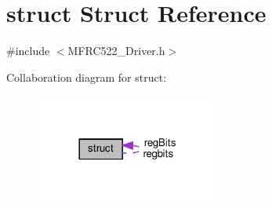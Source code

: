 \hypertarget{structstruct}{}\section{struct Struct Reference}
\label{structstruct}


{\ttfamily \#include $<$M\+F\+R\+C522\+\_\+\+Driver.\+h$>$}



Collaboration diagram for struct\+:\nopagebreak
\begin{figure}[H]
\begin{center}
\leavevmode
\includegraphics[width=173pt]{structstruct__coll__graph}
\end{center}
\end{figure}
